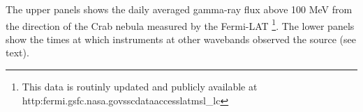 The upper panels shows the daily averaged gamma-ray flux above 100 MeV from the direction of the Crab nebula measured by the Fermi-LAT \footnote{This data is routinly updated and publicly available at http:\/\/fermi.gsfc.nasa.gov\/ssc\/data\/access\/lat\/msl\_lc\/}. The lower panels show the times at which instruments at other wavebands observed the source (see text).\label{fig:lc}
